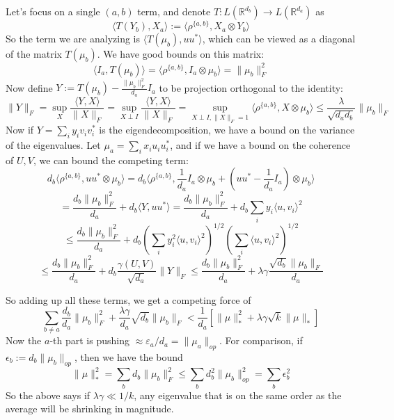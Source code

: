 \documentclass{article}
\newcommand{\R}{{\mathbb{R}}}
\newcommand\eps{\varepsilon}
\begin{document}
Let's focus on a single $(a,b)$ term, and denote $T : L(\R^{d_{b}}) \to L(\R^{d_{a}})$ as
\[ \langle T(Y_{b}), X_{a} \rangle := \langle \rho^{\{a,b\}}, X_{a} \otimes Y_{b} \rangle \]
So the term we are analyzing is $\langle T(\mu_{b}), u u^{*} \rangle$, which can be viewed as a diagonal of the matrix $T(\mu_{b})$. We have good bounds on this matrix:
\[ \langle I_{a}, T(\mu_{b}) \rangle = \langle \rho^{\{a,b\}}, I_{a} \otimes \mu_{b} \rangle = \|\mu_{b}\|_{F}^{2}  \]
Now define $Y := T(\mu_{b}) - \frac{\|\mu_{b}\|_{F}^{2}}{d_{a}} I_{a}$ to be projection orthogonal to the identity:
\[ \|Y\|_{F} = \sup_{X} \frac{ \langle Y,X \rangle }{\|X\|_{F}} = \sup_{X \perp I} \frac{ \langle Y, X \rangle }{\|X\|_{F}} = \sup_{X \perp I, \|X\|_{F} = 1} \langle \rho^{\{a,b\}}, X \otimes \mu_{b} \rangle \leq \frac{\lambda}{\sqrt{d_{a} d_{b}}} \|\mu_{b}\|_{F}     \]
Now if $Y = \sum_{i} y_{i} v_{i} v_{i}^{*}$ is the eigendecomposition, we have a bound on the variance of the eigenvalues. Let $\mu_{a} = \sum_{i} x_{i} u_{i} u_{i}^{*}$, and if we have a bound on the coherence of $U,V$, we can bound the competing term:
\[ d_{b} \langle \rho^{\{a,b\}}, u u^{*} \otimes \mu_{b} \rangle = d_{b} \langle \rho^{\{a,b\}}, \frac{1}{d_{a}} I_{a} \otimes \mu_{b} + (u u^{*} - \frac{1}{d_{a}} I_{a}) \otimes \mu_{b} \rangle    \]
\[ = \frac{d_{b} \|\mu_{b}\|_{F}^{2}}{d_{a}} + d_{b} \langle Y, u u^{*} \rangle
= \frac{d_{b} \|\mu_{b}\|_{F}^{2}}{d_{a}} + d_{b} \sum_{i} y_{i} \langle u, v_{i} \rangle^{2}    \]
\[ \leq \frac{d_{b} \|\mu_{b}\|_{F}^{2}}{d_{a}} + d_{b} \left( \sum_{i} y_{i}^{2} \langle u, v_{i} \rangle^{2}  \right)^{1/2} \left( \sum_{i} \langle u, v_{i} \rangle^{2} \right)^{1/2}   \]
\[ \leq \frac{d_{b} \|\mu_{b}\|_{F}^{2}}{d_{a}} + d_{b} \frac{\gamma(U,V)}{\sqrt{d_{a}}} \|Y\|_{F}
\leq \frac{d_{b} \|\mu_{b}\|_{F}^{2}}{d_{a}} + \lambda \gamma \frac{\sqrt{d_{b}} \|\mu_{b}\|_{F}}{d_{a}}    \]

So adding up all these terms, we get a competing force of
\[ \sum_{b \neq a} \frac{d_{b}}{d_{a}} \|\mu_{b}\|_{F}^{2} + \frac{\lambda \gamma}{d_{a}}  \sqrt{d_{b}} \|\mu_{b}\|_{F} < \frac{1}{d_{a}} \left[ \|\mu\|_{*}^{2} + \lambda \gamma \sqrt{k} \|\mu\|_{*}   \right]   \]
Now the $a$-th part is pushing $\approx \eps_{a}/d_{a} = \|\mu_{a}\|_{op}$. For comparison, if $\epsilon_{b} := d_{b} \|\mu_{b}\|_{op}$, then we have the bound
\[ \|\mu\|_{*}^{2} = \sum_{b} d_{b} \|\mu_{b}\|_{F}^{2} \leq \sum_{b} d_{b}^{2} \|\mu_{b}\|_{op}^{2} = \sum_{b} \epsilon_{b}^{2}   \]
So the above says if $\lambda \gamma \ll 1/k$, any eigenvalue that is on the same order as the average will be shrinking in magnitude.
\end{document}
